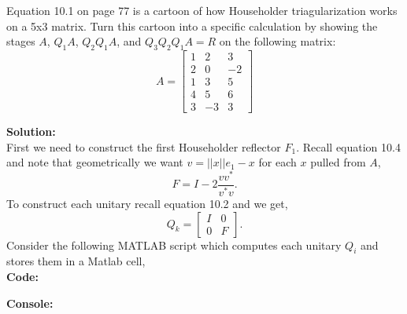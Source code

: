 \documentclass[12pt]{article}
\makeatletter
\theoremstyle{homework}
\newenvironment{exercise}[1]
{\def\@currentlabel{#1}\exercisecore}
{\endexercisecore}
\newcommand{\localhead}[1]{\par\smallskip\noindent\textbf{#1}\nobreak\\}%
\newcommand\solution{\localhead{Solution:}}
\makeatother
\begin{document}
\begin{exercise}{P14} Equation 10.1 on page 77 is a cartoon of how Householder triagularization works on a 
  5x3 matrix. Turn this cartoon into a specific calculation by showing the stages $A$, $Q_1A$, 
  $Q_2Q_1A$, and $Q_3Q_2Q_1A = R$ on the following matrix: 
  \begin{equation*}
    A = 
    \begin{bmatrix}
      1 &2 & 3 \\
      2 &0 & -2 \\
      1 &3 & 5\\ 
      4 &5 & 6\\
      3 &-3& 3 
    \end{bmatrix}
  \end{equation*}
  \solution First we need to construct the first Householder reflector $F_1$. Recall equation 10.4 and note that geometrically we 
  want $v = ||x||e_1 - x$ for each $x$ pulled from $A$, 
  \begin{equation*}
    F = I - 2\dfrac{vv^*}{v^*v}.
  \end{equation*}
  To construct each unitary recall equation 10.2 and we get, 
  \begin{equation*}
    Q_k = \begin{bmatrix}
      I & 0\\
      0 & F
    \end{bmatrix}.
  \end{equation*}
  Consider the following MATLAB script which computes each unitary $Q_i$ and stores them in a Matlab cell,\\ 
  \textbf{Code:}
  \begin{center}
    
  \end{center} 
  \textbf{Console:}
  \begin{center}
    
  \end{center} 
\end{exercise}
\vspace{1in}
\end{document}

